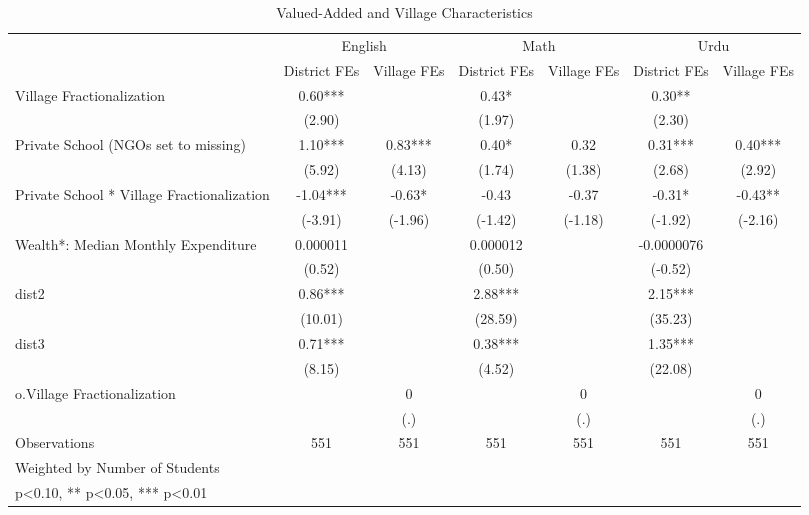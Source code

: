 \begin{sidewaystable}[htbp]\centering
\def\sym#1{\ifmmode^{#1}\else\(^{#1}\)\fi}
\caption{Valued-Added and Village Characteristics\label{valueadded}}
\begin{tabular}{l*{6}{c}}
\toprule
                &\multicolumn{2}{c}{English}&\multicolumn{2}{c}{Math} &\multicolumn{2}{c}{Urdu} \\\cmidrule(lr){2-3}\cmidrule(lr){4-5}\cmidrule(lr){6-7}
                &\multicolumn{1}{c}{District FEs}&\multicolumn{1}{c}{Village FEs}&\multicolumn{1}{c}{District FEs}&\multicolumn{1}{c}{Village FEs}&\multicolumn{1}{c}{District FEs}&\multicolumn{1}{c}{Village FEs}\\
\midrule
Village Fractionalization&     0.60***&            &     0.43*  &            &     0.30** &            \\
                &   (2.90)   &            &   (1.97)   &            &   (2.30)   &            \\
Private School (NGOs set to missing)&     1.10***&     0.83***&     0.40*  &     0.32   &     0.31***&     0.40***\\
                &   (5.92)   &   (4.13)   &   (1.74)   &   (1.38)   &   (2.68)   &   (2.92)   \\
Private School * Village Fractionalization&    -1.04***&    -0.63*  &    -0.43   &    -0.37   &    -0.31*  &    -0.43** \\
                &  (-3.91)   &  (-1.96)   &  (-1.42)   &  (-1.18)   &  (-1.92)   &  (-2.16)   \\
Wealth*: Median Monthly Expenditure& 0.000011   &            & 0.000012   &            &-0.0000076   &            \\
                &   (0.52)   &            &   (0.50)   &            &  (-0.52)   &            \\
dist2           &     0.86***&            &     2.88***&            &     2.15***&            \\
                &  (10.01)   &            &  (28.59)   &            &  (35.23)   &            \\
dist3           &     0.71***&            &     0.38***&            &     1.35***&            \\
                &   (8.15)   &            &   (4.52)   &            &  (22.08)   &            \\
o.Village Fractionalization&            &        0   &            &        0   &            &        0   \\
                &            &      (.)   &            &      (.)   &            &      (.)   \\
\midrule
Observations    &      551   &      551   &      551   &      551   &      551   &      551   \\
\bottomrule
\multicolumn{7}{l}{\footnotesize Weighted by Number of Students}\\
\multicolumn{7}{l}{\footnotesize * p<0.10, ** p<0.05, *** p<0.01}\\
\end{tabular}
\end{sidewaystable}
